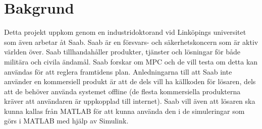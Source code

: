 \section{Bakgrund}    
Detta projekt uppkom genom en industridoktorand vid Linköpings universitet som även arbetar åt Saab. Saab är en försvars- och säkerhetskoncern som är aktiv världen över. Saab tillhandahåller produkter, tjänster och lösningar för både militära och civila ändamål. \citep{SAABbrief}
\newline
\newline
Saab forskar om MPC och de vill testa om detta kan användas för att reglera framtidens plan\citep{danielSimon}.
Anledningarna till att Saab inte använder en kommersiell produkt är att de dels vill ha källkoden för lösaren, dels att de behöver använda systemet offline (de flesta kommersiella produkterna kräver att användaren är uppkopplad till internet).  
\newline
\newline
Saab vill även att lösaren ska kunna kallas från MATLAB för att kunna använda den i de simuleringar som görs i MATLAB med hjälp av Simulink. 
